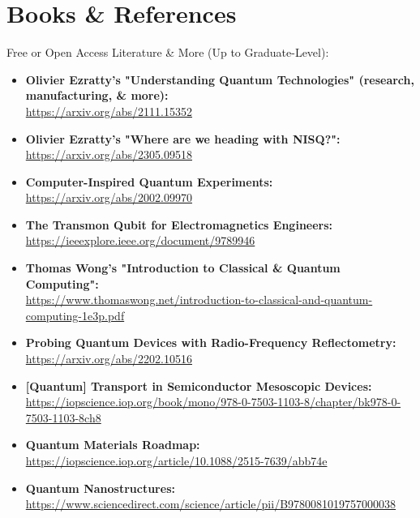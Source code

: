 \chapter{\LARGE{Books \& References}}

\large\begin{flushleft} Free or Open Access Literature \& More (Up to Graduate-Level):
\end{flushleft}

\normalsize\begin{itemize}

  \item\textbf{Olivier Ezratty's "Understanding Quantum Technologies" (research, manufacturing, \& more):}\\
\url{https://arxiv.org/abs/2111.15352}

  \item\textbf{Olivier Ezratty's "Where are we heading with NISQ?":}\\
\url{https://arxiv.org/abs/2305.09518}

  \item\textbf{Computer-Inspired Quantum Experiments:}\\
\url{https://arxiv.org/abs/2002.09970}

  \item\textbf{The Transmon Qubit for Electromagnetics Engineers:}\\
\url{https://ieeexplore.ieee.org/document/9789946}

  \item\textbf{Thomas Wong's "Introduction to Classical \& Quantum Computing":}\\
\url{https://www.thomaswong.net/introduction-to-classical-and-quantum-computing-1e3p.pdf}

  \item\textbf{Probing Quantum Devices with Radio-Frequency Reflectometry:}\\
\url{https://arxiv.org/abs/2202.10516}

  \item\textbf{[Quantum] Transport in Semiconductor Mesoscopic Devices:}\\
\url{https://iopscience.iop.org/book/mono/978-0-7503-1103-8/chapter/bk978-0-7503-1103-8ch8}

  \item\textbf{Quantum Materials Roadmap:}\\
\url{https://iopscience.iop.org/article/10.1088/2515-7639/abb74e}

  \item\textbf{Quantum Nanostructures:}\\
\url{https://www.sciencedirect.com/science/article/pii/B9780081019757000038}


\end{itemize}
